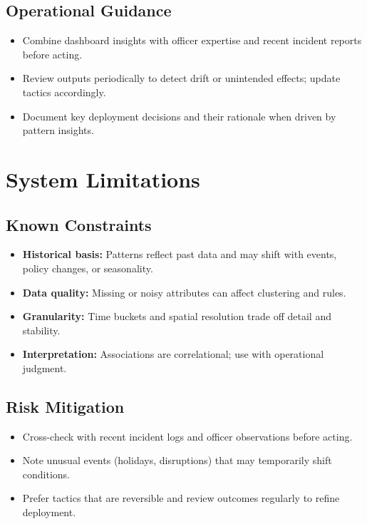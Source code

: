 \documentclass[11pt]{article}
\begin{document}
\subsection{Operational Guidance}
\begin{itemize}[leftmargin=*]
  \item Combine dashboard insights with officer expertise and recent incident reports before acting.
  \item Review outputs periodically to detect drift or unintended effects; update tactics accordingly.
  \item Document key deployment decisions and their rationale when driven by pattern insights.
\end{itemize}

\section{System Limitations}

\subsection{Known Constraints}
\begin{itemize}[leftmargin=*]
  \item \textbf{Historical basis:} Patterns reflect past data and may shift with events, policy changes, or seasonality.
  \item \textbf{Data quality:} Missing or noisy attributes can affect clustering and rules.
  \item \textbf{Granularity:} Time buckets and spatial resolution trade off detail and stability.
  \item \textbf{Interpretation:} Associations are correlational; use with operational judgment.
\end{itemize}

\subsection{Risk Mitigation}
\begin{itemize}[leftmargin=*]
  \item Cross-check with recent incident logs and officer observations before acting.
  \item Note unusual events (holidays, disruptions) that may temporarily shift conditions.
  \item Prefer tactics that are reversible and review outcomes regularly to refine deployment.
\end{itemize}
\end{document}
